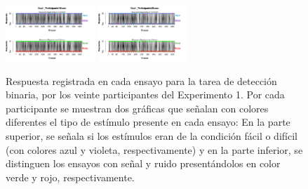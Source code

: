 \documentclass[a4paper ]{article}
\begin{document}
\begin{figure}[th]
\includegraphics[width=0.3\textwidth]{Figures/BiasResp_Exp1_P19} \includegraphics[width=0.3\textwidth]{Figures/BiasResp_Exp1_P20} 
\caption[Respuesta binaria registrada ensayo a ensayo con indicadores de las características de los estímulos presentados; Experimento 1]{Respuesta registrada en cada ensayo para la tarea de detección binaria, por los veinte participantes del Experimento 1. Por cada participante se muestran dos gráficas que señalan con colores diferentes el tipo de estímulo presente en cada ensayo: En la parte superior, se señala si los estímulos eran de la condición fácil o difícil (con colores azul y violeta, respectivamente) y en la parte inferior, se distinguen los ensayos con señal y ruido presentándolos en color verde y rojo, respectivamente.}
\label{fig:BiasResp_E1}
\end{figure}
\end{document}
